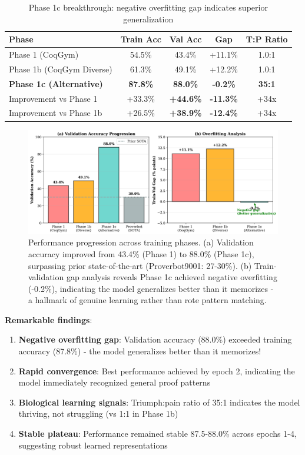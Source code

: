 \documentclass[12pt]{article}
\begin{document}
\begin{table}[h]
\centering
\begin{tabular}{lcccc}
\toprule
\textbf{Phase} & \textbf{Train Acc} & \textbf{Val Acc} & \textbf{Gap} & \textbf{T:P Ratio} \\
\midrule
Phase 1 (CoqGym) & 54.5\% & 43.4\% & +11.1\% & 1.0:1 \\
Phase 1b (CoqGym Diverse) & 61.3\% & 49.1\% & +12.2\% & 1.0:1 \\
\textbf{Phase 1c (Alternative)} & \textbf{87.8\%} & \textbf{88.0\%} & \textbf{-0.2\%} & \textbf{35:1} \\
\midrule
Improvement vs Phase 1 & +33.3\% & \textbf{+44.6\%} & \textbf{-11.3\%} & +34x \\
Improvement vs Phase 1b & +26.5\% & \textbf{+38.9\%} & \textbf{-12.4\%} & +34x \\
\bottomrule
\end{tabular}
\caption{Phase 1c breakthrough: negative overfitting gap indicates superior generalization}
\end{table}

\begin{figure}[h]
\centering
\includegraphics[width=\textwidth]{figure1_performance_comparison.png}
\caption{Performance progression across training phases. (a) Validation accuracy improved from 43.4\% (Phase 1) to 88.0\% (Phase 1c), surpassing prior state-of-the-art (Proverbot9001: 27-30\%). (b) Train-validation gap analysis reveals Phase 1c achieved negative overfitting (-0.2\%), indicating the model generalizes better than it memorizes - a hallmark of genuine learning rather than rote pattern matching.}
\label{fig:performance}
\end{figure}

\textbf{Remarkable findings}:
\begin{enumerate}
\item \textbf{Negative overfitting gap}: Validation accuracy (88.0\%) exceeded training accuracy (87.8\%) - the model generalizes better than it memorizes!
\item \textbf{Rapid convergence}: Best performance achieved by epoch 2, indicating the model immediately recognized general proof patterns
\item \textbf{Biological learning signals}: Triumph:pain ratio of 35:1 indicates the model thriving, not struggling (vs 1:1 in Phase 1b)
\item \textbf{Stable plateau}: Performance remained stable 87.5-88.0\% across epochs 1-4, suggesting robust learned representations
\end{enumerate}
\end{document}
